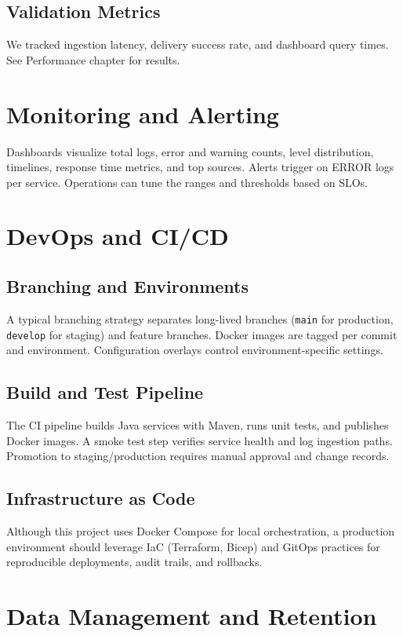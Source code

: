 \documentclass[12pt,a4paper]{report}
\begin{document}
\section{Validation Metrics}
We tracked ingestion latency, delivery success rate, and dashboard query times. See Performance chapter for results.

\chapter{Monitoring and Alerting}
Dashboards visualize total logs, error and warning counts, level distribution, timelines, response time metrics, and top sources. Alerts trigger on ERROR logs per service. Operations can tune the ranges and thresholds based on SLOs.

\chapter{DevOps and CI/CD}
\section{Branching and Environments}
A typical branching strategy separates long-lived branches (\texttt{main} for production, \texttt{develop} for staging) and feature branches. Docker images are tagged per commit and environment. Configuration overlays control environment-specific settings.

\section{Build and Test Pipeline}
The CI pipeline builds Java services with Maven, runs unit tests, and publishes Docker images. A smoke test step verifies service health and log ingestion paths. Promotion to staging/production requires manual approval and change records.

\section{Infrastructure as Code}
Although this project uses Docker Compose for local orchestration, a production environment should leverage IaC (Terraform, Bicep) and GitOps practices for reproducible deployments, audit trails, and rollbacks.

\chapter{Data Management and Retention}
\end{document}
